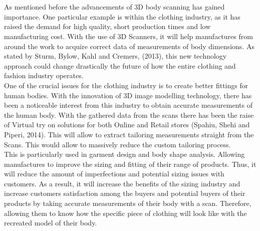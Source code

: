 \documentclass[a4paper]{article}
\begin{document}
 \section*{}
 As mentioned before the advancements of 3D body scanning has gained importance. One particular example is within the clothing industry, as it has raised the demand for high quality, short production times and low manufacturing cost. 
 With the use of 3D Scanners, it will help manufactures from around the work to acquire correct data of measurements of body dimensions. 
 As stated by Sturm, Bylow, Kahl and Cremers, (2013), this new technology approach could change drastically the future of how the entire clothing and fashion industry operates.\\[10pt]
 One of the crucial issues for the clothing industry is to create better fittings for human bodies.
 With the innovation of 3D image modelling technology, there has been a noticeable interest from this industry to obtain accurate measurements of the human body.
 With the gathered data from the scans there has been the raise of Virtual try on solutions for both Online and Retail stores (Spahiu, Shehi and Piperi, 2014). 
 This will allow to extract tailoring measurements straight from the Scans. This would allow to massively reduce the custom tailoring process. \\[10pt]
 This is particularly used in garment design and body shape analysis. Allowing manufactures to improve the sizing and fitting of their range of products. 
 Thus, it will reduce the amount of imperfections and potential sizing issues with customers. 
 As a result, it will increase the benefits of the sizing industry and increase customers satisfaction among the buyers and potential buyers of their products by taking accurate measurements of their body with a scan. 
 Therefore, allowing them to know how the specific piece of clothing will look like with the recreated model of their body. 
 \enlargethispage{\baselineskip}
\end{document}
